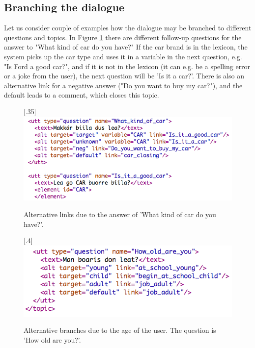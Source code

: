 \documentclass[11pt]{article}
\begin{document}
\subsection{Branching the dialogue} 

Let us consider couple of examples how the dialogue may be branched to different questions and topics. In Figure \ref{car} there are different follow-up questions for the answer to "What kind of car do you have?" If the car brand is in the lexicon, the system picks up the car type and uses it in a variable in the next question, e.g. "Is Ford a good car?", and if it is not in the lexicon (it can e.g. be a spelling error or a joke from the user), the next question will be 'Is it a car?'. There is also an alternative link for a negative answer ("Do you want to buy my car?"), and the default leads to a comment, which closes this topic. \\

\begin{figure}[htbp]
\begin{center}
\scalebox{.35}[.35]{\includegraphics{presentation/img/what_car.png}}\\
\caption{Alternative links due to the answer of 'What kind of car do you have?'.}
\label{car}
\end{center}
\end{figure}

\begin{figure}[htbp]
\begin{center}
\scalebox{.4}[.4]{\includegraphics{presentation/img/age_branching.png}}\\
\caption{Alternative branches due to the age of the user. The question is 'How old are you?'.}
\label{agebranches}
\end{center}
\end{figure}
\end{document}
